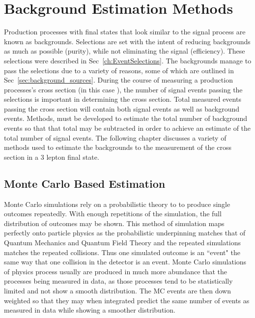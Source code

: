 \chapter{Background Estimation Methods}
Production processes with final states that look similar to the signal process are known as backgrounds. Selections are set with the intent of reducing backgrounds as much as possible (purity), while not eliminating the signal (efficiency). These selections were described in Sec~\ref{ch:EventSelections}. The backgrounds manage to pass the selections due to a variety of reasons, some of which are outlined in Sec~\ref{sec:background_sources}. During the course of measuring a production processes's cross section (in this case \ttZ), the number of signal events passing the selections is important in determining the cross section. Total measured events passing the cross section will contain both signal events as well as background events. Methods, must be developed to estimate the total number of background events so that that total may be subtracted in order to achieve an estimate of the total number of signal events. The following chapter discusses a variety of methods used to estimate the backgrounds to the measurement of the \ttZ cross section in a 3 lepton final state.\\


	\section{Monte Carlo Based Estimation}
	\label{sec:irreducible_estimation}
	
	Monte Carlo simulations rely on a probabilistic theory to to produce single outcomes repeatedly. With enough repetitions of the simulation, the full distribution of outcomes may be shown. This method of simulation maps perfectly onto particle physics as the probabilistic underpinning matches that of Quantum Mechanics and Quantum Field Theory and the repeated simulations matches the repeated collisions. Thus one simulated outcome is an ``event" the same way that one collision in the detector is an event. Monte Carlo simulations of physics process usually are produced in much more abundance that the processes being measured in data, as those processes tend to be statistically limited and not show a smooth distribution. The MC events are then down weighted so that they may when integrated predict the same number of events as measured in data while showing a smoother distribution.\\
	

